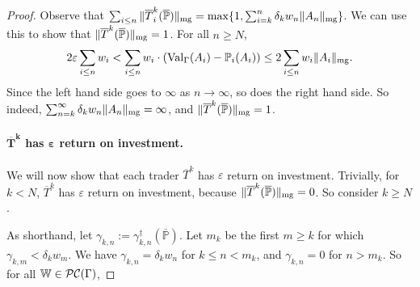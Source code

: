 \documentclass[authordate,onecolumn,noenvironments]{miri-tech-article}
\numberwithin{equation}{subsection}
\newcommand{\seq}[1]{{\overline{#1}}}
\newcommand{\nn}{n}
\newcommand{\fuz}{w}
\newcommand{\aff}{A}
\newcommand{\trade}{T}%
\newcommand{\Trader}{\seq{\trade}} %
\newcommand{\gens}{\dagger}
\newcommand{\gen}[1]{{#1^\gens}}
\newcommand{\magnit}[1]{{\|#1\|_{\rm mg}}} %
\newcommand{\BelState}{\mathbb{P}}
\newcommand{\pt}{\BelState}
\newcommand{\MP}{\seq{\pt}}
\newcommand{\ftn}{(\MP)} %
\newcommand{\cworlds}{\mathcal{P\-C}} %
\newcommand{\World}{\mathbb{W}}
\newcommand{\Theory}{\Gamma}
\newcommand{\thmval}[1][\Theory]{\operatorname{Val}_{#1}\-} %
\begin{document}
\begin{proof}
      Observe that $\sum_{i\le n} \magnit{ \Trader^k_i \ftn } = \max\{1, \sum_{i=k}^n \delta_k \fuz_n \magnit{\aff_n} \}$.  We can use this to show that $\magnit{\Trader^k \ftn} = 1$.  For all $n \geq N$,
        \[ 
2 \varepsilon \sum_{i \leq \nn} \fuz_i
<
\sum_{i\leq \nn}\fuz_i \cdot (\thmval(\aff_i) - \pt_i(\aff_i))
\leq 2 \sum_{i \leq n} \fuz_i \magnit{\aff_i}.
        \]
        Since the left hand side goes to $\infty$ as $n \to \infty$, so does the right hand side.  So indeed, $\sum_{n=k}^\infty \delta_k \fuz_n \magnit{\aff_n} = \infty$, and $\magnit{\Trader^k \ftn} = 1$.

        \paragraph{$\bm{\Trader^k}$ has $\bm{\varepsilon}$ return on investment.}
        We will now show that each trader $\Trader^k$ has $\varepsilon$ return on investment.  Trivially, for $k < N$, $\Trader^k$ has $\varepsilon$ return on investment, because $\magnit{\Trader^k \ftn} = 0$.  So consider $k \geq N$.

        As shorthand, let $\gamma_{k, n} := \gen{\gamma_{k, n}} \ftn$.  Let $m_k$ be the first $m \geq k$ for which $\gamma_{k,m} < \delta_k \fuz_m$.  We have $\gamma_{k, n} = \delta_k \fuz_n$ for $k \leq n < m_k$, and $\gamma_{k, n} = 0$ for $n > m_k$.  So for all $\World \in \cworlds(\Theory)$,


\end{proof}
\end{document}
